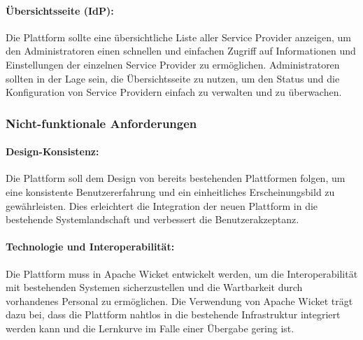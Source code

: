 \paragraph{Übersichtsseite (IdP):}
Die Plattform sollte eine übersichtliche Liste aller Service Provider anzeigen, um den Administratoren einen schnellen und einfachen Zugriff auf Informationen und Einstellungen der einzelnen Service Provider zu ermöglichen.
Administratoren sollten in der Lage sein, die Übersichtsseite zu nutzen, um den Status und die Konfiguration von Service Providern einfach zu verwalten und zu überwachen.

\subsubsection{Nicht-funktionale Anforderungen}\label{subsubsec:non-functional-requirements}

\paragraph{Design-Konsistenz:}
Die Plattform soll dem Design von bereits bestehenden Plattformen folgen, um eine konsistente Benutzererfahrung und ein einheitliches Erscheinungsbild zu gewährleisten. 
Dies erleichtert die Integration der neuen Plattform in die bestehende Systemlandschaft und verbessert die Benutzerakzeptanz.

\paragraph{Technologie und Interoperabilität:}
Die Plattform muss in Apache Wicket entwickelt werden, um die Interoperabilität mit bestehenden Systemen sicherzustellen und die Wartbarkeit durch vorhandenes Personal zu ermöglichen.
Die Verwendung von Apache Wicket trägt dazu bei, dass die Plattform nahtlos in die bestehende Infrastruktur integriert werden kann und die Lernkurve im Falle einer Übergabe gering ist.
